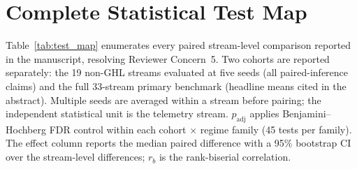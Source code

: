 \section{Complete Statistical Test Map}\label{sup:test_map}

Table~\ref{tab:test_map} enumerates every paired stream-level comparison reported in the manuscript, resolving Reviewer Concern~5. Two cohorts are reported separately: the 19 non-GHL streams evaluated at five seeds (all paired-inference claims) and the full 33-stream primary benchmark (headline means cited in the abstract). Multiple seeds are averaged within a stream before pairing; the independent statistical unit is the telemetry stream. $p_{\mathrm{adj}}$ applies Benjamini--Hochberg FDR control within each cohort $\times$ regime family (45 tests per family). The effect column reports the median paired difference with a 95\% bootstrap CI over the stream-level differences; $r_b$ is the rank-biserial correlation.

